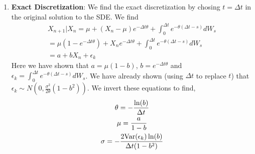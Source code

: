 \documentclass{article}
\begin{document}
\begin{enumerate}
        \item \textbf{Exact Discretization}: 
            We find the exact discretization by chosing $t = \Delta t$ in the original
            solution to the SDE. We find
            \begin{gather*}
                X_{n+1} | X_{n} = \mu + (X_{n} - \mu)e^{-\Delta t \theta} +
                \int_0^{\Delta t} e^{-\theta (\Delta t - s)}dW_s
                \\
                = \mu\left(1 - e^{-\Delta t\theta}\right) + X_n e^{-\Delta t \theta} + \int_0^{\Delta t} e^{-\theta (\Delta t - s)}dW_s
                \\
                = a + bX_n + \epsilon_k
            \end{gather*}
            Here we have shown that $a = \mu(1 - b)$, $b
            = e^{-\Delta t \theta}$ and $\epsilon_k = \int_0^{\Delta t}
            e^{-\theta (\Delta t - s)}dW_s$. We have already shown (using
            $\Delta t$ to replace $t$) that $\epsilon_k \sim
            N\left(0,\frac{\sigma^2}{2\theta}(1 - b^2)\right)$. We invert these
            equations to find, 
            \begin{gather*}
                \theta =- \frac{\ln(b)}{\Delta t}
                \\
                \mu = \frac{a}{1 - b}
                \\
                \sigma = -\frac{2\text{Var}(\epsilon_k)\ln(b)}{\Delta t(1 - b^2)}
            \end{gather*}
    \end{enumerate}
\end{document}
